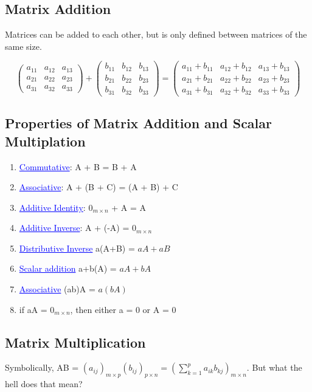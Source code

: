 \documentclass{article}
\newcommand{\bul}[1]{\textcolor{blue}{\underline{#1}}}
\begin{document}
\subsection{Matrix Addition}
Matrices can be added to each other, but is only defined between matrices of the same size.

\[
\begin{pmatrix}
a_{11} & a_{12} & a_{13} \\
a_{21} & a_{22} & a_{23} \\
a_{31} & a_{32} & a_{33}
\end{pmatrix}
+
\begin{pmatrix}
b_{11} & b_{12} & b_{13} \\
b_{21} & b_{22} & b_{23} \\
b_{31} & b_{32} & b_{33}
\end{pmatrix}
=
\begin{pmatrix}
a_{11} + b_{11} & a_{12} + b_{12} & a_{13} + b_{13} \\
a_{21} + b_{21} & a_{22} + b_{22} & a_{23} + b_{23} \\
a_{31} + b_{31} & a_{32} + b_{32} & a_{33} + b_{33}
\end{pmatrix}
\]

\subsection{Properties of Matrix Addition and Scalar Multiplation}

\begin{enumerate}
    \item \bul{Commutative}: A + B = B + A
    \item \bul{Associative}: A + (B + C) = (A + B) + C
    \item \bul{Additive Identity}: $0_{m\times n}$ + A = A 
    \item \bul{Additive Inverse}: A + (-A) = $0_{m\times n}$
    \item \bul{Distributive Inverse} a(A+B) = $aA + aB$
    \item \bul{Scalar addition} a+b(A) = $aA + bA$
    \item \bul{Associative} (ab)A = $a(bA)$
    \item \bul{} if aA = $0_{m\times n}$, then either a = 0 or A = 0
\end{enumerate}

\subsection{Matrix Multiplication}
Symbolically, AB = $(a_{ij})_{m\times p}(b_{ij})_{p\times n} = (\sum^p_{k=1}a_{ik}b_{kj})_{m\times n}$. But what the hell does that mean?
\end{document}
